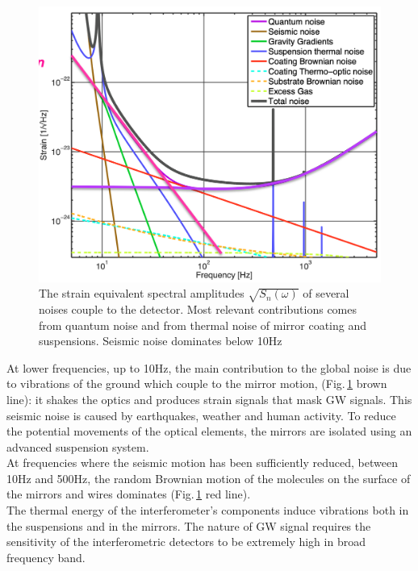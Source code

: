 \documentclass[binding=0.6cm, LaM]{sapthesis}
\begin{document}
		\begin{figure}[H]
                        \includegraphics[scale=0.3]{noise2}
                        \centering
                        \caption{The strain equivalent spectral amplitudes $\sqrt{S_n(\omega)}$ of several noises couple to the detector. Most relevant contributions comes from quantum noise and from thermal noise of mirror coating and suspensions. Seismic noise dominates below 10Hz}
                        \label{fig:noise2}
                \end{figure}
        At lower frequencies, up to 10Hz, the main contribution to the global noise
        is due to vibrations of the ground which couple to the mirror motion, (Fig.\,\ref{fig:noise2} brown line): 
	it shakes the optics and produces strain signals that mask GW signals. 
        This seismic noise is caused by earthquakes, weather and human activity.
        To reduce the potential movements of the optical elements,
        the mirrors are isolated using an advanced suspension system. \\
        At frequencies where the seismic motion has been sufficiently reduced,
        between 10Hz and 500Hz, the random Brownian motion of the molecules on the surface of the mirrors and wires dominates (Fig.\,\ref{fig:noise2} red line). \\
        The thermal energy of the interferometer’s components induce vibrations both in the suspensions and in the mirrors.
        The nature of GW signal requires the sensitivity of the interferometric detectors
        to be extremely high in broad frequency band.
\end{document}
